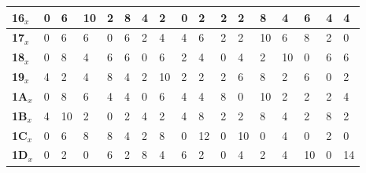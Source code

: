 \begin{longtable}[c]{|l|l|l|l|l|l|l|l|l|l|l|l|l|l|l|l|l|}
\textbf{16$_x$} & 0              & 6              & 10             & 2              & 8              & 4              & 2              & 0              & 2              & 2              & 2              & 8              & 4              & 6              & 4              & 4              \\ \hline
\textbf{17$_x$} & 0              & 6              & 6              & 0              & 6              & 2              & 4              & 4              & 6              & 2              & 2              & 10             & 6              & 8              & 2              & 0              \\ \hline
\textbf{18$_x$} & 0              & 8              & 4              & 6              & 6              & 0              & 6              & 2              & 4              & 0              & 4              & 2              & 10             & 0              & 6              & 6              \\ \hline
\textbf{19$_x$} & 4              & 2              & 4              & 8              & 4              & 2              & 10             & 2              & 2              & 2              & 6              & 8              & 2              & 6              & 0              & 2              \\ \hline
\textbf{1A$_x$} & 0              & 8              & 6              & 4              & 4              & 0              & 6              & 4              & 4              & 8              & 0              & 10             & 2              & 2              & 2              & 4              \\ \hline
\textbf{1B$_x$} & 4              & 10             & 2              & 0              & 2              & 4              & 2              & 4              & 8              & 2              & 2              & 8              & 4              & 2              & 8              & 2              \\ \hline
\textbf{1C$_x$} & 0              & 6              & 8              & 8              & 4              & 2              & 8              & 0              & 12             & 0              & 10             & 0              & 4              & 0              & 2              & 0              \\ \hline
\textbf{1D$_x$} & 0              & 2              & 0              & 6              & 2              & 8              & 4              & 6              & 2              & 0              & 4              & 2              & 4              & 10             & 0              & 14             \\ \hline

\end{longtable}
